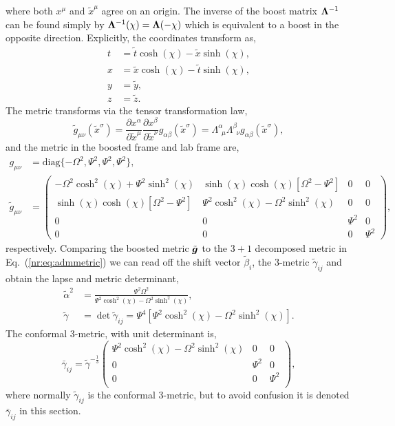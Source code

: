 where both $x^\mu$ and $\tilde{x}^\mu$ agree on an origin. The inverse of the boost matrix $\boldsymbol{\Lambda}^{-1}$ can be found simply by $\boldsymbol{\Lambda}^{-1}(\chi) = \boldsymbol{\Lambda}(-\chi)$ which is equivalent to a boost in the opposite direction. Explicitly, the coordinates transform as,
\begin{align}
 t &= \tilde{t}\cosh(\chi) - \tilde{x} \sinh(\chi),\\
 x &= \tilde{x}\cosh(\chi)-\tilde{t}\sinh(\chi),\\
 y &= \tilde{y},\\
 z &= \tilde{z} .
\end{align}
The metric transforms via the tensor transformation law,
\begin{equation}
\tilde{g}_{\mu\nu}(\tilde{x}^\sigma)= \frac{\partial x^\alpha}{\partial \tilde{x}^\mu}  \frac{\partial x^\beta}{\partial \tilde{x}^\nu}g_{\alpha\beta}(\tilde{x}^\sigma) = \Lambda^\alpha_{\,\,\,\mu}\Lambda^\beta_{\,\,\,\nu} g_{\alpha\beta}(\tilde{x}^\sigma),
\end{equation}
and the metric in the boosted frame and lab frame are,
\begin{align}
 g_{\mu\nu} &= \mathrm{diag} \{ -\Omega^2, \Psi^2,  \Psi^2, \Psi^2\} ,\\
 \tilde{g}_{\mu\nu}&=\begin{pmatrix} -\Omega^2\cosh^2 (\chi) + \Psi^2 \sinh^2 (\chi) & \sinh(\chi)\cosh(\chi)\left[\Omega^2-\Psi^2\right] & 0& 0 \\  \sinh(\chi)\cosh(\chi)\left[\Omega^2-\Psi^2\right] & \Psi^2 \cosh^2 (\chi) - \Omega^2 \sinh^2 (\chi) & 0 & 0\\ 0 & 0&\Psi^2&0 \\ 0&0&0&\Psi^2\end{pmatrix},
 \end{align}
 respectively. Comparing the boosted metric $\tilde{\boldsymbol{g}}$ to the $3+1$ decomposed metric in Eq.~(\ref{nr:eq:admmetric}) we can read off the shift vector $\tilde{\beta}_i$, the 3-metric $\tilde{\gamma}_{ij}$ and obtain the lapse and metric determinant,
\begin{align}
\tilde{\alpha}^2 &= \frac{\Psi ^2 \Omega ^2}{\Psi ^2 \cosh ^2(\chi) -\Omega ^2 \sinh ^2(\chi) },\\
\tilde{\gamma} &= \det \tilde{\gamma}_{ij} = \Psi^4\left[ \Psi^2 \cosh^2 (\chi) - \Omega^2 \sinh^2(\chi)\right].
\end{align}
The conformal 3-metric, with unit determinant is,
\begin{equation} \bar{\gamma}_{ij} = \tilde{\gamma}^{-\frac{1}{3}}\left(
\begin{array}{ccc}
 \Psi ^2 \cosh ^2(\chi) -\Omega ^2 \sinh ^2(\chi)  & 0 & 0 \\
 0 & \Psi ^2 & 0 \\
 0 & 0 & \Psi ^2 \\
\end{array}
\right),\end{equation}
where normally $\tilde{\gamma}_{ij}$ is the conformal 3-metric, but to avoid confusion it is denoted $\bar{\gamma}_{ij}$ in this section.

